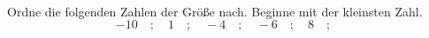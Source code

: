 \begin{aufgabe} ~ \\ 
Ordne die folgenden Zahlen der Gr\"o\ss{}e nach. Beginne mit der kleinsten Zahl.\[-10\quad ; \quad1\quad ; \quad-4\quad ; \quad-6\quad ; \quad8\quad ; \quad\]\end{aufgabe} 
